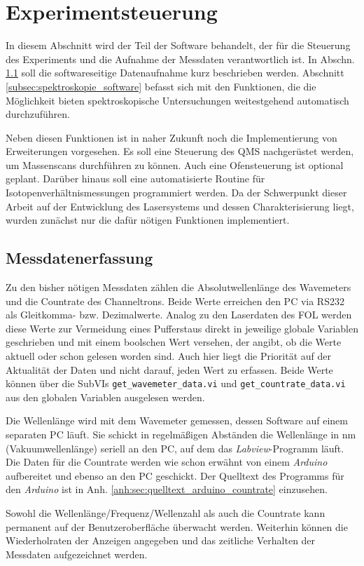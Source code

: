 \section{Experimentsteuerung}\label{sec:experimentsteuerung}
In diesem Abschnitt wird der Teil der Software behandelt, der für die Steuerung
des Experiments und die Aufnahme der Messdaten verantwortlich ist. In Abschn.
\ref{subsec:messdatenerfassung} soll die softwareseitige Datenaufnahme kurz
beschrieben werden. Abschnitt \ref{subsec:spektroskopie_software} befasst sich mit den
Funktionen, die die Möglichkeit bieten spektroskopische Untersuchungen
weitestgehend automatisch durchzuführen.\par
Neben diesen Funktionen ist in naher Zukunft noch die Implementierung von
Erweiterungen vorgesehen. Es soll eine Steuerung des QMS nachgerüstet werden, um
Massenscans durchführen zu können. Auch eine Ofensteuerung ist optional geplant.
Darüber hinaus soll eine automatisierte Routine für Isotopenverhältnismessungen
programmiert werden. Da der Schwerpunkt dieser Arbeit auf der Entwicklung des
Lasersystems und dessen Charakterisierung liegt, wurden zunächst nur die dafür
nötigen Funktionen implementiert.

\subsection{Messdatenerfassung}\label{subsec:messdatenerfassung}
Zu den bisher nötigen Messdaten zählen die Absolutwellenlänge des Wavemeters und
die Countrate des Channeltrons. Beide Werte erreichen den PC via RS232 als
Gleitkomma- bzw. Dezimalwerte. Analog zu den Laserdaten des FOL werden diese
Werte zur Vermeidung eines Pufferstaus direkt in jeweilige globale Variablen
geschrieben und mit einem boolschen Wert versehen, der angibt, ob die Werte
aktuell oder schon gelesen worden sind. Auch hier liegt die Priorität auf der
Aktualität der Daten und nicht darauf, jeden Wert zu erfassen. Beide Werte
können über die SubVIs \lstinline|get_wavemeter_data.vi| und
\lstinline|get_countrate_data.vi| aus den globalen Variablen ausgelesen
werden.\par
Die Wellenlänge wird mit dem Wavemeter gemessen, dessen Software auf einem
separaten PC läuft. Sie schickt in regelmäßigen Abständen die Wellenlänge in nm
(Vakuumwellenlänge) seriell an den PC, auf dem das \textit{Labview}-Programm läuft. Die Daten für die Countrate werden wie schon
erwähnt von einem \textit{Arduino} aufbereitet und ebenso an
den PC geschickt. Der Quelltext des Programms für den \textit{Arduino} ist in Anh.
\ref{anh:sec:quelltext_arduino_countrate} einzusehen.\par
Sowohl die Wellenlänge/Frequenz/Wellenzahl als auch die Countrate kann
permanent auf der Benutzeroberfläche überwacht werden. Weiterhin können die
Wiederholraten der Anzeigen angegeben und das zeitliche Verhalten der Messdaten
aufgezeichnet werden.

